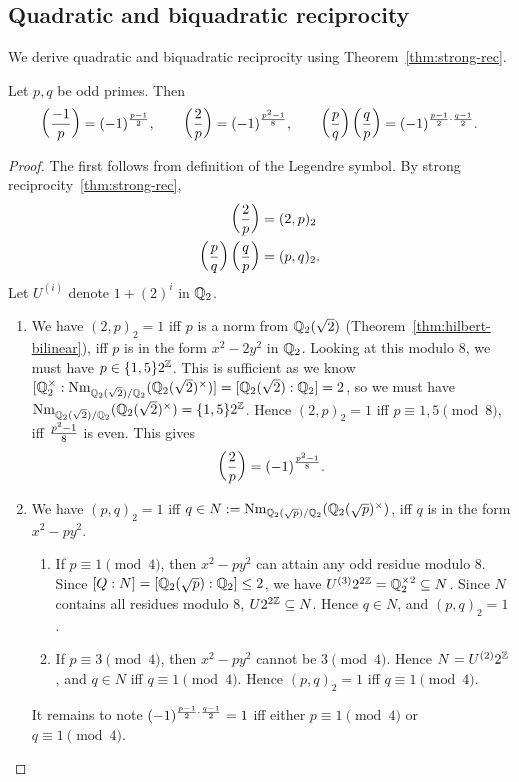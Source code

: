 \subsection{Quadratic and biquadratic reciprocity}
We derive quadratic and biquadratic reciprocity using Theorem~\ref{thm:strong-rec}.
\begin{thm}
Let $p,q$ be odd primes. Then
\[
\left( {\frac{-1}{p}} \right)=(-1)^{\frac{p-1}{2}},\qquad \left( {\frac{2}{p}} \right)=(-1)^{\frac{p^2-1}{8}},\qquad \left( {\frac{p}{q}} \right) \left( {\frac{q}{p}} \right)=(-1)^{\frac{p-1}{2}\cdot \frac{q-1}{2}}.
\]
\end{thm}
\begin{proof}
The first follows from definition of the Legendre symbol. 
By strong reciprocity~\ref{thm:strong-rec}, 
\begin{align*}
\left( {\frac{2}{p}} \right)&=(2,p)_2\\
\left( {\frac{p}{q}} \right)\left( {\frac{q}{p}} \right)&=(p,q)_2.
\end{align*}
Let $U^{(i)}$ denote $1+(2)^i$ in $\mathbb{Q}_2$.
\begin{enumerate}
\item We have $(2,p)_2=1$ iff $p$ is a norm from $\mathbb{Q}_2(\sqrt 2)$ (Theorem~\ref{thm:hilbert-bilinear}), iff $p$ is in the form $x^2-2y^2$ in $\mathbb{Q}_2$. Looking at this modulo 8, we must have $p\in \{1,5\}2^{\mathbb{Z}}$. This is sufficient as we know $[\mathbb{Q}_2^{\times}:\operatorname{Nm}_{\mathbb{Q}_2(\sqrt2)/\mathbb{Q}_2}(\mathbb{Q}_2(\sqrt2)^{\times})]=[\mathbb{Q}_2(\sqrt2):\mathbb{Q}_2]=2$, so we must have $\operatorname{Nm}_{\mathbb{Q}_2(\sqrt2)/\mathbb{Q}_2}(\mathbb{Q}_2(\sqrt2)^{\times})=\{1,5\}2^{\mathbb{Z}}$. Hence $(2,p)_2=1$ iff $p\equiv 1,5\pmod 8$, iff $\frac{p^2-1}{8}$ is even. This gives
\[
\left( {\frac{2}{p}} \right)=(-1)^{\frac{p^2-1}{8}}.
\]
\item We have $(p,q)_2=1$ iff $q\in N:=\operatorname{Nm}_{\mathbb{Q}_2(\sqrt p)/\mathbb{Q}_2}(\mathbb{Q}_2(\sqrt p)^{\times})$, iff $q$ is in the form $x^2-py^2$. 
\begin{enumerate}
\item
If $p\equiv 1\pmod 4$, then $x^2-py^2$ can attain any odd residue modulo 8. Since $[Q:N]=[\mathbb{Q}_2(\sqrt p):\mathbb{Q}_2]\le 2$, we have $U^{(3)}2^{2\mathbb{Z}}= \mathbb{Q}_2^{\times 2} \subseteq N$. Since $N$ contains all residues modulo 8, $U2^{2\mathbb{Z}}\subseteq N$. Hence $q\in N$, and $(p,q)_2=1$.
\item
If $p\equiv 3\pmod 4$, then $x^2-py^2$ cannot be $3\pmod 4$. Hence $N=U^{(2)}2^{\mathbb{Z}}$, and $q\in N$ iff $q\equiv 1\pmod 4$. Hence $(p,q)_2=1$ iff $q\equiv 1\pmod 4$.
\end{enumerate}
It remains to note $(-1)^{\frac{p-1}{2}\cdot \frac{q-1}{2}}=1$ iff either $p\equiv 1\pmod 4$ or $q\equiv 1\pmod 4$.
\qedhere
\end{enumerate}
\end{proof}
